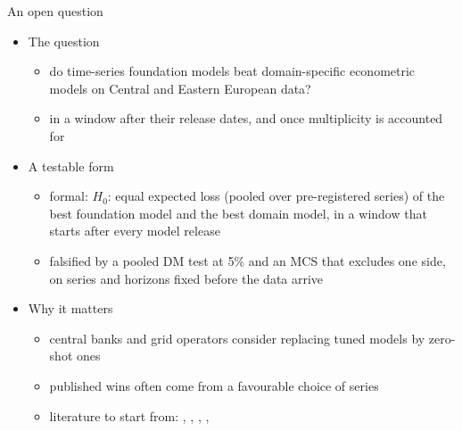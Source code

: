 \begin{frame}{An open question}
\itemsize{\small}
\begin{itemize}
    \item The question
    \begin{itemize}
        \item do time-series foundation models beat domain-specific econometric models on Central and Eastern European data?
        \item in a window after their release dates, and once multiplicity is accounted for
    \end{itemize}
    \item A testable form
    \begin{itemize}
        \item formal: $H_0$: equal expected loss (pooled over pre-registered series) of the best foundation model and the best domain model, in a window that starts after every model release
        \item falsified by a pooled DM test at 5\% and an MCS that excludes one side, on series and horizons fixed before the data arrive
    \end{itemize}
    \item Why it matters
    \begin{itemize}
        \item central banks and grid operators consider replacing tuned models by zero-shot ones
        \item published wins often come from a favourable choice of series
        \item literature to start from: , , , , 
    \end{itemize}
\end{itemize}
\end{frame}

